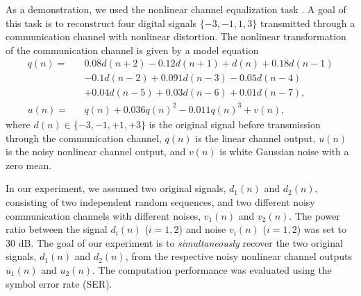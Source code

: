 \documentclass{article}
\begin{document}
As a demonstration, we used the nonlinear channel equalization task \cite{Jaeger2004}.
%
A goal of this task is to reconstruct four digital signals $\{-3,-1,1,3\}$ 
transmitted through a communication channel with nonlinear distortion. 
%
The nonlinear transformation of the communication channel is given by 
a model equation \cite{Paquot2012} 
%
\begin{eqnarray}
q(n) = && 0.08d(n+2)-0.12d(n+1)+d(n)+0.18d(n-1) \nonumber \\
&& -0.1d(n-2)+0.091d(n-3)-0.05d(n-4)  \\
&& +0.04d(n-5)+0.03d(n-6)+0.01d(n-7), \nonumber \\
%
u(n) = && q(n) + 0.036q(n)^2 -0.011q(n)^3 + v(n),
\end{eqnarray}
where $d(n) \in \{-3,-1,+1,+3\}$ is the original signal before
transmission through the communication channel, $q(n)$ is the linear
channel output, $u(n)$ is the noisy nonlinear channel output, 
and $v(n)$ is white Gaussian noise with a zero mean. 
%

In our experiment, we assumed 
two original signals, $d_1(n)$ and $d_2(n)$, consisting of 
two independent random sequences, and two different noisy communication
channels with different noises, $v_1(n)$ and $v_2(n)$.
%
The power ratio between the signal $d_i(n)$ ($i=1,2$) and noise $v_i(n)$ ($i=1,2$) 
was set to 30 dB.
%
The goal of our experiment is to {\it simultaneously} recover the two original
signals, $d_1(n)$ and $d_2(n)$, from the respective noisy nonlinear
channel outputs 
$u_1(n)$ and $u_2(n)$. 
%
The computation performance was evaluated using the symbol error rate (SER). 
\end{document}
